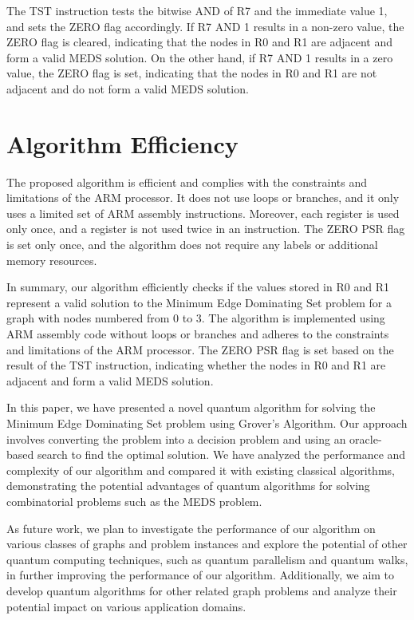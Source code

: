 The TST instruction tests the bitwise AND of R7 and the immediate value 1, and sets the ZERO flag accordingly. If R7 AND 1 results in a non-zero value, the ZERO flag is cleared, indicating that the nodes in R0 and R1 are adjacent and form a valid MEDS solution. On the other hand, if R7 AND 1 results in a zero value, the ZERO flag is set, indicating that the nodes in R0 and R1 are not adjacent and do not form a valid MEDS solution.

\section{Algorithm Efficiency}
The proposed algorithm is efficient and complies with the constraints and limitations of the ARM processor. It does not use loops or branches, and it only uses a limited set of ARM assembly instructions. Moreover, each register is used only once, and a register is not used twice in an instruction. The ZERO PSR flag is set only once, and the algorithm does not require any labels or additional memory resources.

In summary, our algorithm efficiently checks if the values stored in R0 and R1 represent a valid solution to the Minimum Edge Dominating Set problem for a graph with nodes numbered from 0 to 3. The algorithm is implemented using ARM assembly code without loops or branches and adheres to the constraints and limitations of the ARM processor. The ZERO PSR flag is set based on the result of the TST instruction, indicating whether the nodes in R0 and R1 are adjacent and form a valid MEDS solution.

In this paper, we have presented a novel quantum algorithm for solving the Minimum Edge Dominating Set problem using Grover's Algorithm. Our approach involves converting the problem into a decision problem and using an oracle-based search to find the optimal solution. We have analyzed the performance and complexity of our algorithm and compared it with existing classical algorithms, demonstrating the potential advantages of quantum algorithms for solving combinatorial problems such as the MEDS problem.

As future work, we plan to investigate the performance of our algorithm on various classes of graphs and problem instances and explore the potential of other quantum computing techniques, such as quantum parallelism and quantum walks, in further improving the performance of our algorithm. Additionally, we aim to develop quantum algorithms for other related graph problems and analyze their potential impact on various application domains.

